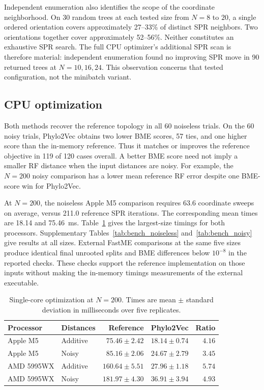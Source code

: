 \documentclass[11pt,a4paper]{article}
\makeatletter
\DeclareRobustCommand{\_}{\ifmmode\nfss@text{\textunderscore}\else\textunderscore\allowbreak\fi}
\theoremstyle{definition}
\makeatother
\begin{document}
Independent enumeration also identifies the scope of the coordinate neighborhood.
On 30 random trees at each tested size from $N=8$ to $20$, a single ordered orientation covers approximately 27--33\% of distinct SPR neighbors.
Two orientations together cover approximately 52--56\%.
Neither constitutes an exhaustive SPR search.
The full CPU optimizer's additional SPR scan is therefore material: independent enumeration found no improving SPR move in 90 returned trees at $N=10,16,24$.
This observation concerns that tested configuration, not the minibatch variant.

\subsection{CPU optimization}

Both methods recover the reference topology in all 60 noiseless trials.
On the 60 noisy trials, Phylo2Vec obtains two lower BME scores, 57 ties, and one higher score than the in-memory reference.
Thus it matches or improves the reference objective in 119 of 120 cases overall.
A better BME score need not imply a smaller RF distance when the input distances are noisy.
For example, the $N=200$ noisy comparison has a lower mean reference RF error despite one BME-score win for Phylo2Vec.

At $N=200$, the noiseless Apple M5 comparison requires 63.6 coordinate sweeps on average, versus 211.0 reference SPR iterations.
The corresponding mean times are 18.14 and 75.46~ms.
Table~\ref{tab:cpu_summary} gives the largest-size timings for both processors.
Supplementary Tables~\ref{tab:bench_noiseless} and~\ref{tab:bench_noisy} give results at all sizes.
External FastME comparisons at the same five sizes produce identical final unrooted splits and BME differences below $10^{-8}$ in the reported checks.
These checks support the reference implementation on those inputs without making the in-memory timings measurements of the external executable.

\begin{table}[tb]
\centering
\caption{Single-core optimization at $N=200$. Times are mean $\pm$ standard deviation in milliseconds over five replicates.}
\label{tab:cpu_summary}
\small
\begin{tabular}{@{}llrrr@{}}
\toprule
Processor & Distances & Reference & Phylo2Vec & Ratio\\
\midrule
Apple M5 & Additive & $75.46\pm2.42$ & $18.14\pm0.74$ & $4.16$\\
Apple M5 & Noisy & $85.16\pm2.06$ & $24.67\pm2.79$ & $3.45$\\
AMD 5995WX & Additive & $160.64\pm5.51$ & $27.96\pm1.18$ & $5.74$\\
AMD 5995WX & Noisy & $181.97\pm4.30$ & $36.91\pm3.94$ & $4.93$\\
\bottomrule
\end{tabular}
\end{table}
\end{document}
